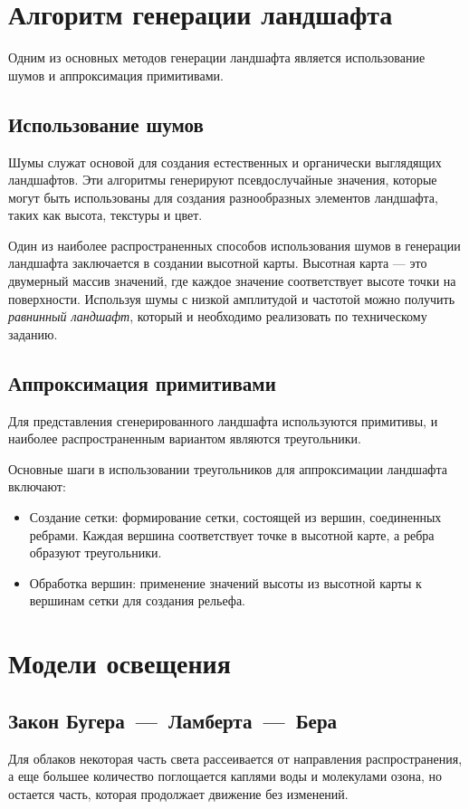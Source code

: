 \section{Алгоритм генерации ландшафта}
 Одним из основных методов генерации ландшафта является использование шумов и аппроксимация примитивами.

\subsection{Использование шумов}

Шумы служат основой для создания естественных и органически выглядящих ландшафтов. Эти алгоритмы генерируют псевдослучайные значения, которые могут быть использованы для создания разнообразных элементов ландшафта, таких как высота, текстуры и цвет.

Один из наиболее распространенных способов использования шумов в генерации ландшафта заключается в создании высотной карты. Высотная карта — это двумерный массив значений, где каждое значение соответствует высоте точки на поверхности. 
Используя шумы с низкой амплитудой и частотой можно получить \textit{равнинный ландшафт}, который и необходимо реализовать по техническому заданию.

\subsection{Аппроксимация примитивами}

Для представления сгенерированного ландшафта используются примитивы, и наиболее распространенным вариантом являются треугольники.

Основные шаги в использовании треугольников для аппроксимации ландшафта включают:
\begin{itemize}
	\item Создание сетки: формирование сетки, состоящей из вершин, соединенных ребрами. Каждая вершина соответствует точке в высотной карте, а ребра образуют треугольники.
	\item Обработка вершин: применение значений высоты из высотной карты к вершинам сетки для создания рельефа.
\end{itemize}

\section{Модели освещения}
\subsection{Закон Бугера~---~Ламберта~---~Бера}
Для облаков некоторая часть света рассеивается от направления распространения, а еще большее количество поглощается каплями воды и молекулами озона, но остается часть, которая продолжает движение без изменений.

